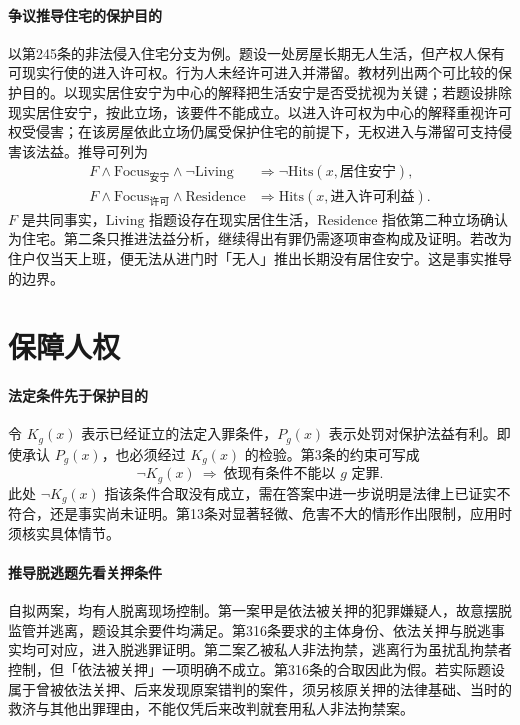 \paragraph{争议推导\quad 住宅的保护目的}
以第245条的非法侵入住宅分支为例。题设一处房屋长期无人生活，但产权人保有可现实行使的进入许可权。行为人未经许可进入并滞留。教材列出两个可比较的保护目的。以现实居住安宁为中心的解释把生活安宁是否受扰视为关键；若题设排除现实居住安宁，按此立场，该要件不能成立。以进入许可权为中心的解释重视许可权受侵害；在该房屋依此立场仍属受保护住宅的前提下，无权进入与滞留可支持侵害该法益。推导可列为
\begin{align*}
  F\land\mathrm{Focus}_{\text{安宁}}\land\neg\mathrm{Living}
   &\Rightarrow \neg\mathrm{Hits}(x,\text{居住安宁}),\\
  F\land\mathrm{Focus}_{\text{许可}}\land\mathrm{Residence}
   &\Rightarrow \mathrm{Hits}(x,\text{进入许可利益}).
\end{align*}
\(F\) 是共同事实，\(\mathrm{Living}\) 指题设存在现实居住生活，\(\mathrm{Residence}\) 指依第二种立场确认为住宅。第二条只推进法益分析，继续得出有罪仍需逐项审查构成及证明。若改为住户仅当天上班，便无法从进门时「无人」推出长期没有居住安宁。这是事实推导的边界。

\section{保障人权}

\paragraph{法定条件先于保护目的}
令 \(K_g(x)\) 表示已经证立的法定入罪条件，\(P_g(x)\) 表示处罚对保护法益有利。即使承认 \(P_g(x)\)，也必须经过 \(K_g(x)\) 的检验。第3条的约束可写成
\[
 \neg K_g(x)\ \Rightarrow\ \text{依现有条件不能以 }g\text{ 定罪}.
\]
此处 \(\neg K_g(x)\) 指该条件合取没有成立，需在答案中进一步说明是法律上已证实不符合，还是事实尚未证明。第13条对显著轻微、危害不大的情形作出限制，应用时须核实具体情节。

\paragraph{推导\quad 脱逃题先看关押条件}
自拟两案，均有人脱离现场控制。第一案甲是依法被关押的犯罪嫌疑人，故意摆脱监管并逃离，题设其余要件均满足。第316条要求的主体身份、依法关押与脱逃事实均可对应，进入脱逃罪证明。第二案乙被私人非法拘禁，逃离行为虽扰乱拘禁者控制，但「依法被关押」一项明确不成立。第316条的合取因此为假。若实际题设属于曾被依法关押、后来发现原案错判的案件，须另核原关押的法律基础、当时的救济与其他出罪理由，不能仅凭后来改判就套用私人非法拘禁案。

